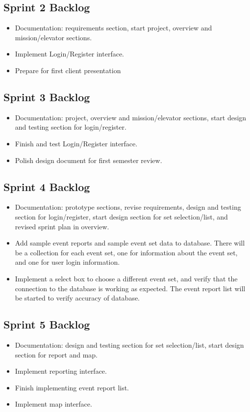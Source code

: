 \subsection{Sprint 2 Backlog}
\begin{itemize}
\itemsep0em
\item Documentation: requirements section, start project, overview and mission/elevator sections.
\item Implement Login/Register interface.
\item Prepare for first client presentation
\end{itemize}

\subsection{Sprint 3 Backlog}
\begin{itemize}
\itemsep0em
\item Documentation: project, overview and mission/elevator sections, start design and testing section for login/register.
\item Finish and test Login/Register interface.
\item Polish design document for first semester review.
\end{itemize}

\subsection{Sprint 4 Backlog}
\begin{itemize}
\itemsep0em
\item Documentation: prototype sections, revise requirements, design and testing section for login/register, start design section for set selection/list, and revised sprint plan in overview.
\item Add sample event reports and sample event set data to database. There will be a collection for each event set, one for information about the event set, and one for user login information.
\item Implement a select box to choose a different event set, and verify that the connection to the database is working as expected. The event report list will be started to verify accuracy of database.
\end{itemize}

\subsection{Sprint 5 Backlog}
\begin{itemize}
\itemsep0em
\item Documentation: design and testing section for set selection/list, start design section for report and map.
\item Implement reporting interface.
\item Finish implementing event report list.
\item Implement map interface.
\end{itemize}

